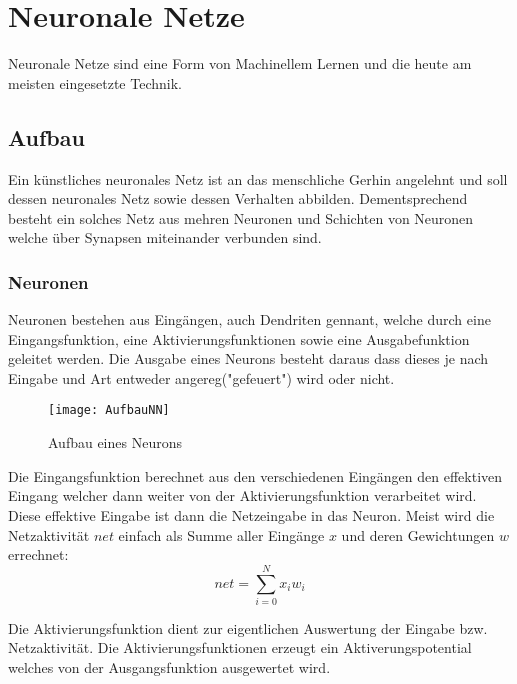     \section{Neuronale Netze}
    Neuronale Netze sind eine Form von Machinellem Lernen und die heute am meisten eingesetzte Technik.
    
    \subsection{Aufbau}
    Ein künstliches neuronales Netz ist an das menschliche Gerhin angelehnt und soll dessen neuronales Netz sowie dessen Verhalten abbilden. 
    Dementsprechend besteht ein solches Netz aus mehren Neuronen und Schichten von Neuronen welche über Synapsen miteinander verbunden sind.


    \subsubsection{Neuronen}
    Neuronen bestehen aus Eingängen, auch Dendriten gennant, welche durch eine Eingangsfunktion, eine Aktivierungsfunktionen sowie eine Ausgabefunktion geleitet werden.
    Die Ausgabe eines Neurons besteht daraus dass dieses je nach Eingabe und Art entweder angereg("gefeuert") wird oder nicht.
    
    \begin{figure}[H]
        \centering
        \texttt{[image: AufbauNN]}
        \caption{Aufbau eines Neurons}
        \label{fig:AufbauNN}
    \end{figure}
    
    \noindent
    Die Eingangsfunktion berechnet aus den verschiedenen Eingängen den effektiven Eingang welcher dann weiter von der Aktivierungsfunktion verarbeitet wird.
    Diese effektive Eingabe ist dann die Netzeingabe in das Neuron.
    Meist wird die Netzaktivität \(net\) einfach als Summe aller Eingänge \(x\) und deren Gewichtungen \(w\) errechnet:
    \begin{equation}
        net = \sum_{i=0}^N x_i w_i
    \end{equation}
    \newline

    \noindent
    Die Aktivierungsfunktion dient zur eigentlichen Auswertung der Eingabe bzw. Netzaktivität.
    Die Aktivierungsfunktionen erzeugt ein Aktiverungspotential welches von der Ausgangsfunktion ausgewertet wird.
    \newline
    
